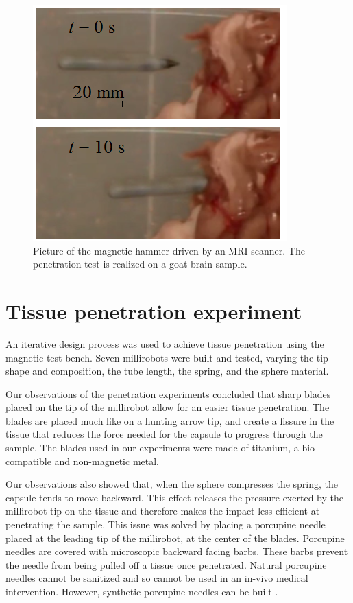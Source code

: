 \documentclass[letterpaper, 10 pt, journal, twoside]{ieeetran}
\begin{document}
\begin{figure}
\centering
  \includegraphics[width=120 pt]{tests_in_MRI.png}
  \caption{Picture of the magnetic hammer driven by an MRI scanner. The penetration test is realized on a goat brain sample.}
  \label{MRI_test}
	\vspace{-2em}
\end{figure}

\section{Tissue penetration experiment}

An iterative design process was used to achieve tissue penetration using the magnetic test bench. Seven millirobots were built and tested, varying the tip shape and composition, the tube length, the spring, and the sphere material. \par
Our observations of the penetration experiments concluded that sharp blades placed on the tip of the millirobot allow for an easier tissue penetration. The blades are placed much like on a hunting arrow tip, and create a fissure in the tissue that reduces the force needed for the capsule to progress through the sample. The blades used in our experiments were made of titanium, a bio-compatible and non-magnetic metal.\par
Our observations also showed that, when the sphere compresses the spring, the capsule tends to move backward. This effect releases the pressure exerted by the millirobot tip on the tissue and therefore makes the impact less efficient at penetrating the sample. This issue was solved by placing a porcupine needle placed at the leading tip of the millirobot, at the center of the blades. Porcupine needles are covered with microscopic backward facing barbs. These barbs prevent the needle from being pulled off a tissue once penetrated. Natural porcupine needles cannot be sanitized and so cannot be used in an in-vivo medical intervention. However, synthetic porcupine needles can be built \cite{cho2012microstructured}.\par
\end{document}
